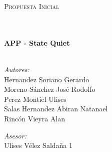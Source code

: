 \documentclass[10pt]{article}
\begin{document}
\begin{center}
\begin{minipage}{0.9\textwidth} 
\begin{center}                                                                                  %
\textsc{\LARGE Propuesta Inicial}
\end{center}
\end{minipage}\\[0.5cm]
            \vspace*{1cm}                                                                       %
\HRule \\[0.4cm]                                                                    %
{ \huge \bfseries APP - State Quiet}\\[0.4cm]  %
\HRule \\[1.5cm]                                                                    %
\begin{minipage}{0.46\textwidth}                                                    %
\begin{flushleft} \large                                                            %
\emph{Autores:}\\ 
Hernandez Soriano Gerardo  \\
Moreno Sánchez José Rodolfo\\
Perez Montiel Ulises\\
Salas Hernandez Abiran Natanael\\ 
Rincón Vieyra Alan 
\end{flushleft}                                                                     %
\end{minipage}      
\begin{minipage}{0.52\textwidth}        
\vspace{-0.6cm}                                         %
\begin{flushright} \large                                                           %
\emph{Asesor:} \\                                                                 %
Ulises Vélez Saldaña 1\\                                             %
\end{flushright}                                                                    %
\end{minipage}  
\vspace*{1cm}
    

\end{center}
\end{document}
